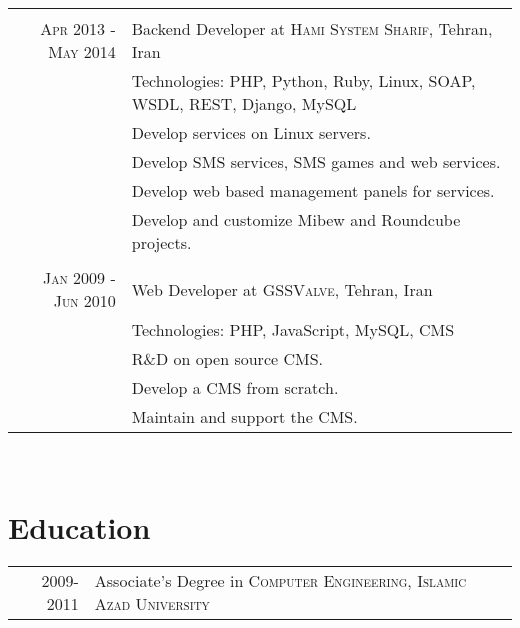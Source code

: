 \documentclass[a4paper,11pt]{article}
\begin{document}
\begin{tabular}{r|p{11cm}}
    \multicolumn{2}{c}{}\\
    \textsc{Apr 2013 - May 2014}
    & Backend Developer at \textsc{Hami System Sharif},
    Tehran, Iran\\
    &\footnotesize{Technologies: PHP, Python, Ruby, Linux, SOAP, WSDL, REST, Django, MySQL}\\
    &\footnotesize{Develop services on Linux servers.}\\
    &\footnotesize{Develop SMS services, SMS games and web services.}\\
    &\footnotesize{Develop web based management panels for services.}\\
    &\footnotesize{Develop and customize Mibew and Roundcube projects.}\\

    \multicolumn{2}{c}{}\\
    \textsc{Jan 2009 - Jun 2010}
    & Web Developer at \textsc{GSSValve},
    Tehran, Iran\\
    &\footnotesize{Technologies: PHP, JavaScript, MySQL, CMS}\\
    &\footnotesize{R\&D on open source CMS.}\\
    &\footnotesize{Develop a CMS from scratch.}\\
    &\footnotesize{Maintain and support the CMS.}

\end{tabular}\\

\section{Education}
\begin{tabular}{rp{12cm}}

    \textsc{} 2009-2011 & Associate’s Degree in \textsc{Computer Engineering},
    \textsc{Islamic Azad University}\\

\end{tabular}\\

\end{document}

